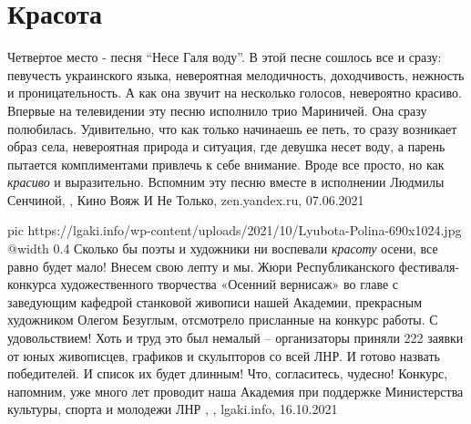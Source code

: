  
 
 
 
 
\chapter{Красота}
\label{sec:slova.krasota}

Четвертое место - песня \enquote{Несе Галя воду}. В этой песне сошлось все и
сразу: певучесть украинского языка, невероятная мелодичность, доходчивость,
нежность и проницательность. А как она звучит на несколько голосов, невероятно
красиво. Впервые на телевидении эту песню исполнило трио Мариничей. Она сразу
полюбилась. Удивительно, что как только начинаешь ее петь, то сразу возникает
образ села, невероятная природа и ситуация, где девушка несет воду, а парень
пытается комплиментами привлечь к себе внимание. Вроде все просто, но как
\emph{красиво} и выразительно. Вспомним эту песню вместе в исполнении Людмилы
Сенчиной,
, 
Кино Вояж И Не Только, zen.yandex.ru, 07.06.2021

\ifcmt
  pic https://lgaki.info/wp-content/uploads/2021/10/Lyubota-Polina-690x1024.jpg
  @width 0.4
\fi
Сколько бы поэты и художники ни воспевали \emph{красоту} осени, все равно будет
мало!  Внесем свою лепту и мы. Жюри Республиканского фестиваля-конкурса
художественного творчества «Осенний вернисаж» во главе с заведующим кафедрой
станковой живописи нашей Академии, прекрасным художником Олегом Безуглым,
отсмотрело присланные на конкурс работы. С удовольствием! Хоть и труд это был
немалый – организаторы приняли 222 заявки от юных живописцев, графиков и
скульпторов со всей ЛНР. И готово назвать победителей. И список их будет
длинным! Что, согласитесь, чудесно!  Конкурс, напомним, уже много лет проводит
наша Академия при поддержке Министерства культуры, спорта и молодежи ЛНР
, , lgaki.info, 16.10.2021
